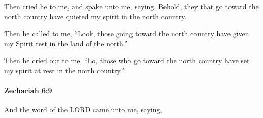 			\begin{versebox}
					\item[BHS] 
					\item[LXX] 
					\item[ASV] Then cried he to me, and spake unto me, saying, Behold, they that go toward the north country have quieted my spirit in the north country.
					\item[NIV] Then he called to me, “Look, those going toward the north country have given my Spirit rest in the land of the north.”
					\item[NRSV] Then he cried out to me, “Lo, those who go toward the north country have set my spirit at rest in the north country.”
			\end{versebox}

		\paragraph{Zechariah 6:9} %
			\label{ZECHARIAH-6-9}

			And the word of the LORD came unto me, saying,

